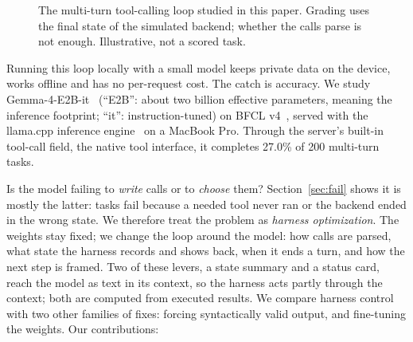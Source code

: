 \documentclass[11pt]{article}
\begin{document}
\begin{figure}[H]
\centering
{}
\caption{The multi-turn tool-calling loop studied in this paper. Grading uses the final state of the simulated backend; whether the calls parse is not enough. Illustrative, not a scored task.}
\label{fig:vignette}
\end{figure}

Running this loop locally with a small model keeps private data on the device, works offline and has no per-request cost. The catch is accuracy. We study Gemma-4-E2B-it~\cite{gemma4e2b} (``E2B'': about two billion effective parameters, meaning the inference footprint; ``it'': instruction-tuned) on BFCL v4~\cite{patil2024bfcl}, served with the llama.cpp inference engine~\cite{llamacpp} on a MacBook Pro. Through the server's built-in tool-call field, the native tool interface, it completes 27.0\% of 200 multi-turn tasks.

Is the model failing to \emph{write} calls or to \emph{choose} them? Section~\ref{sec:fail} shows it is mostly the latter: tasks fail because a needed tool never ran or the backend ended in the wrong state. We therefore treat the problem as \emph{harness optimization}. The weights stay fixed; we change the loop around the model: how calls are parsed, what state the harness records and shows back, when it ends a turn, and how the next step is framed. Two of these levers, a state summary and a status card, reach the model as text in its context, so the harness acts partly through the context; both are computed from executed results. We compare harness control with two other families of fixes: forcing syntactically valid output, and fine-tuning the weights. Our contributions:
\end{document}
